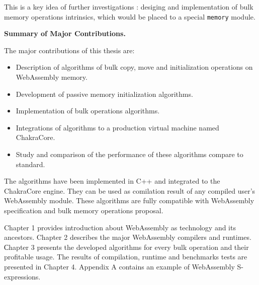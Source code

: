 This is a key idea of further investigations : desiging and implementation of bulk memory operations intrinsics, which would be placed to a special \texttt{memory} module.


\textbf{Summary of Major Contributions.}

The major contributions of this thesis are:
\begin{itemize}
  \item Description of algorithms of bulk copy, move and initialization operations on WebAssembly memory.
  \item Development of passive memory initialization algorithms.
  \item Implementation of bulk operations algorithms.
  \item Integrations of algorithms to a production virtual machine named ChakraCore.
  \item Study and comparison of the performance of these algorithms compare to standard.
\end{itemize}

The algorithms have been implemented in C++ and integrated to the ChakraCore engine.
They can be used as comilation result of any compiled user's WebAssembly module.
These algorithms are fully compatible with WebAssembly specification and bulk memory operations proposal.

Chapter 1 provides introduction about WebAssembly as technology and its ancestors. 
Chapter 2 describes the major WebAssembly compilers and runtimes.
Сhapter 3 presents the developed algorithms for every bulk operation and their profitable usage. 
The results of compilation, runtime and benchmarks tests are presented in Chapter 4.
Appendix A contains an example of WebAssembly S-expressions.